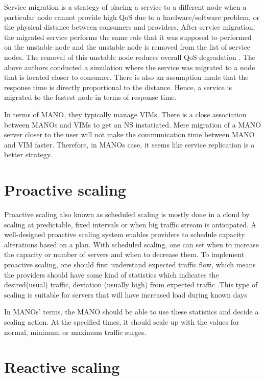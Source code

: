 Service migration is a strategy of placing a service to a different node when a particular node cannot provide high QoS due to a hardware/software problem, or the physical distance between consumers and providers. After service migration, the migrated service performs the same role that it was supposed to performed on the unstable node and the unstable node is removed from the list of service nodes.
The removal of this unstable node reduces overall QoS degradation \cite{lee_software_2010}.
The above authors conducted a simulation where the service was migrated to a node that is located closer to consumer. There is also an assumption made that the response time is directly proportional to the distance. Hence, a service is migrated to the fastest node in terms of response time.

In terms of MANO, they typically manage VIMs. There is a close association between MANOs and VIMs to get an NS instatiated.
Mere migration of a MANO server closer to the user will not make the communication time between MANO and VIM faster. Therefore, in MANOs case, it seems like service replication is a better strategy.


\section{Proactive scaling}

Proactive scaling also known as scheduled scaling is mostly done in a cloud by scaling at predictable, fixed intervals or when big traffic stream is anticipated. A well-designed proactive scaling system enables providers to schedule capacity alterations based on a plan.
With scheduled scaling, one can set when to increase the capacity or number of servers and when to decrease them. To implement proactive scaling, one should first understand expected traffic flow, which means the providers should have some kind of statistics which indicates the desired(usual) traffic, deviation (usually high) from expected traffic \cite{falatah_cloud_2014}\cite{reese_cloud_nodate}.This type of scaling is suitable for servers that will have increased load during known days 

In MANOs' terms, the MANO should be able to use these statistics and decide a scaling action. At the specified times, it should scale up with the values for normal, minimum or maximum traffic surges.


\section{Reactive scaling}

